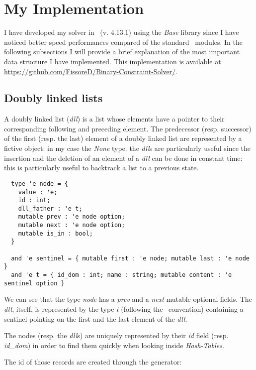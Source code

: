 \documentclass{rapport}
\begin{document}
\section{My Implementation}

I have developed my solver in \ml\ (v. 4.13.1) using the \textit{Base} library since I have noticed better speed performances compared of the standard \ml\ modules. In the following subsections I will provide a brief explanation of the most important data structure I have implemented. This implementation is available at \url{https://github.com/FissoreD/Binary-Constraint-Solver/}.

\subsection{Doubly linked lists}

A doubly linked list (\textit{dll}) is a list whose elements have a pointer to their corresponding following and preceding element. The predecessor (resp. successor) of the first (resp. the last) element of a doubly linked list are represented by a fictive object: in my case the \textit{None} type. the \textit{dll}s are particularly useful since the insertion and the deletion of an element of a \textit{dll} can be done in constant time: this is particularly useful to backtrack a list to a previous state.

\begin{verbatim}
  type 'e node = {
    value : 'e;
    id : int;
    dll_father : 'e t;
    mutable prev : 'e node option;
    mutable next : 'e node option;
    mutable is_in : bool;
  }
  
  and 'e sentinel = { mutable first : 'e node; mutable last : 'e node }
  and 'e t = { id_dom : int; name : string; mutable content : 'e sentinel option }
\end{verbatim}

We can see that the type \textit{node} has a \textit{prev} and a \textit{next} mutable optional fields. The \textit{dll}, itself, is represented by the type \textit{t} (following the \ml\ convention) containing a sentinel pointing on the first and the last element of the \textit{dll}.

The nodes (resp. the \textit{dll}s) are uniquely represented by their \textit{id} field (resp. \textit{id\_dom}) in order to find them quickly when looking inside \textit{Hash-Tables}.

The id of those records are created through the generator:
\end{document}
